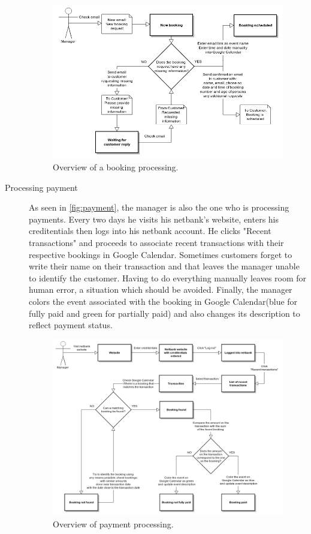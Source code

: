 \begin{description}
\begin{figure}[htbp]
    \centering
        \includegraphics[width=\textwidth]{figures/manager.png}
            \caption{Overview of a booking processing.}
        \label{fig:manager}
\end{figure}

\item[Processing payment]
As seen in \autoref{fig:payment}, the manager is also the one who is processing payments. Every two days
he visits his netbank's website, enters his creditentials then logs into his netbank account. He clicks 
"Recent transactions" and proceeds to  associate recent transactions with their respective bookings in Google Calendar. 
Sometimes customers forget to write their name on their transaction and that leaves the manager unable to identify the customer. 
Having to do everything manually leaves room for human error, a situation which should be avoided. Finally, the manager colors the event associated with the booking
in Google Calendar(blue for fully paid and green for partially paid) and also changes its description to reflect payment status.

\begin{figure}[htbp]
    \centering
        \includegraphics[width=\textwidth]{figures/payment.png}
            \caption{Overview of payment processing.}
        \label{fig:payment}
\end{figure}


\end{description}
